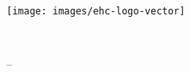 \vspace{-0.5cm}
\texttt{[image: images/ehc-logo-vector]}

\vspace{8.5cm}
\begin{minipage}{\textwidth}
	\sffamily

	\vspace{2mm}
	{\YUGE \raggedleft\bookletunittitle\\}

	\vspace{1mm}
	{\huge \raggedleft\coursetitle { }-- \formattedunittitle\\}

	\vspace{2mm}
	{\small \raggedleft\bookletsubtitle\\}
\end{minipage}